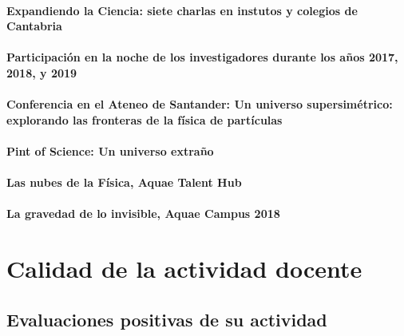 \documentclass[a4paper, 11pt, twoside, openright]{report}
\begin{document}
\paragraph{Expandiendo la Ciencia: siete charlas en instutos y colegios de Cantabria}


\paragraph{Participación en la noche de los investigadores durante los años 2017, 2018, y 2019}


\paragraph{Conferencia en el Ateneo de Santander: Un universo supersimétrico: explorando las fronteras de la física de partículas}


\paragraph{Pint of Science: Un universo extraño}


\paragraph{Las nubes de la Física, Aquae Talent Hub}


\paragraph{La gravedad de lo invisible, Aquae Campus 2018} 


\section{Calidad de la actividad docente}

\subsection{Evaluaciones positivas de su actividad}
\end{document}
